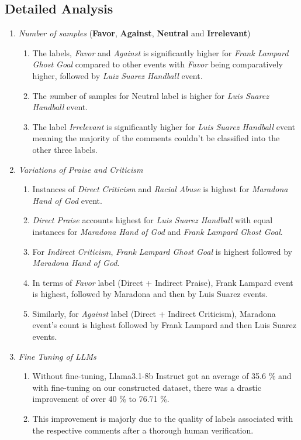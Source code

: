 \documentclass[sigconf, review]{acmart}
\begin{document}
\subsection{Detailed Analysis}
\begin{enumerate}
    \item \textit{Number of samples} (\textbf{Favor}, \textbf{Against}, \textbf{Neutral} and \textbf{Irrelevant})
    \begin{enumerate}
    \item The labels, \textit{Favor} and \textit{Against} is significantly higher for  \textit{Frank Lampard Ghost Goal} compared to other events with \textit{Favor} being comparatively higher, followed by \textit{Luiz Suarez Handball} event.
    \item The \textit number of samples for {Neutral} label is higher for \textit{Luis Suarez Handball} event.
    \item The label \textit{Irrelevant} is significantly higher for \textit{Luis Suarez Handball} event meaning the majority of the comments couldn't be classified into the other three labels.
    \end{enumerate}
    \item \textit{Variations of Praise and Criticism}
    \begin{enumerate}
        \item Instances of \textit{Direct Criticism} and \textit{Racial Abuse} is highest for \textit{Maradona Hand of God} event.
        \item \textit{Direct Praise} accounts highest for \textit{Luis Suarez Handball} with equal instances for \textit{Maradona Hand of God} and \textit{Frank Lampard Ghost Goal}.
        \item For \textit{Indirect Criticism}, \textit{Frank Lampard Ghost Goal} is highest followed by \textit{Maradona Hand of God}.
        \item In terms of \textit{Favor} label (Direct + Indirect Praise), Frank Lampard event is highest, followed by Maradona and then by Luis Suarez events.
        \item  Similarly, for \textit{Against} label (Direct + Indirect Criticism), Maradona event's count is highest followed by Frank Lampard and then Luis Suarez events.
    \end{enumerate}


      \item \textit{Fine Tuning of LLMs}
    \begin{enumerate}
        \item Without fine-tuning, Llama3.1-8b Instruct got an average of 35.6 \% and with fine-tuning on our constructed dataset, there was a drastic improvement of over 40 \% to 76.71 \%.
        \item This improvement is majorly due to the quality of labels associated with the respective comments after a thorough human verification.
       
    \end{enumerate}
    
    
\end{enumerate}
\end{document}
